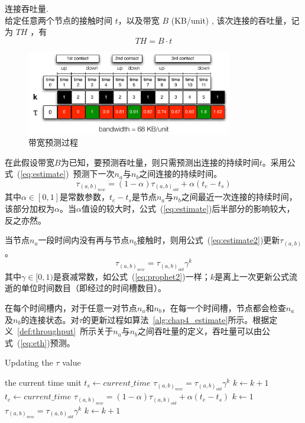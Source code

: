 \begin{definition}连接吞吐量. \\
给定任意两个节点的接触时间 $t$，以及带宽 $B$ (KB/unit) , 该次连接的吞吐量，记为 $TH$ ，有
\[
TH=B\cdot t
\]
\label{def:throughput}
\end{definition}

\begin{figure}
  \centering
  \includegraphics[width=0.8\textwidth]{paper-data/example2}
  \caption{带宽预测过程}
  \label{fig:chap4_example2}
\end{figure}

在此假设带宽$B$为已知，要预测吞吐量，则只需预测出连接的持续时间$t$。采用公式~(\ref{eq:estimate})~预测下一次$n_a$与$n_b$之间连接的持续时间。
\begin{equation}
\tau_{(a,b)_{new}}=(1-\alpha)\tau_{(a,b)_{old}}+\alpha(t_e-t_s)
\label{eq:estimate}
\end{equation}
其中$\alpha\in[0,1]$是常数参数，$t_e-t_s$是节点$n_a$与$n_b$之间最近一次连接的持续时间，该部分加权为$\alpha$。当$\alpha$值设的较大时，公式~(\ref{eq:estimate})后半部分的影响较大，反之亦然。

当节点$n_a$一段时间内没有再与节点$n_b$接触时，则用公式~(\ref{eq:estimate2})更新$\tau_{(a,b)}$。
\begin{equation}
\tau_{(a,b)_{new}}=\tau_{(a,b)_{old}}\gamma^{k}
\label{eq:estimate2}
\end{equation}
其中$\gamma\in[0,1)$是衰减常数，如公式~(\ref{eq:prophet2})一样；$k$是离上一次更新公式流逝的单位时间数目（即经过的时间槽数目）。

在每个时间槽内，对于任意一对节点$n_a$和$n_b$，在每一个时间槽，节点都会检查$n_a$及$n_b$的连接状态。对$\tau$的更新过程如算法~\ref{alg:chap4_estimate}所示。根据定义~\ref{def:throughput}~所示关于$n_a$与$n_b$之间吞吐量的定义，吞吐量可以由公式~(\ref{eq:eth})预测。

\begin{algorithm}[tbp] %
\renewcommand{\algorithmicrequire}{\textbf{For}}
\caption{Updating the $\tau$ value} %
\label{alg:chap4_estimate} %
\begin{algorithmic}[1] %
\REQUIRE the current time unit
    \STATE $t_s\leftarrow current\_time$
    \STATE $\tau_{(a,b)_{new}}=\tau_{(a,b)_{old}}\gamma^{k}$
    \STATE $k\leftarrow k+1$
    \STATE $t_e\leftarrow current\_time$
    \STATE $\tau_{(a,b)_{new}}=(1-\alpha)\tau_{(a,b)_{old}}+\alpha(t_e-t_s)$
    \STATE $k\leftarrow 1$
\ELSE
    \STATE $\tau_{(a,b)_{new}}=\tau_{(a,b)_{old}}\gamma^{k}$
    \STATE $k\leftarrow k+1$
\ENDIF    
\end{algorithmic}
\end{algorithm}

